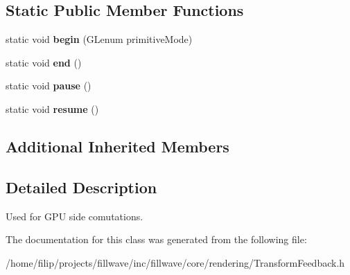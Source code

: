 \subsection*{Static Public Member Functions}
\begin{DoxyCompactItemize}
\item 
\mbox{\label{classflw_1_1flc_1_1TransformFeedback_a5ed5f1b7c44ae0021917762769c2c208}} 
static void {\bfseries begin} (G\+Lenum primitive\+Mode)
\item 
\mbox{\label{classflw_1_1flc_1_1TransformFeedback_aa1b77fac24fcb1c506e1e6d2bcd51de8}} 
static void {\bfseries end} ()
\item 
\mbox{\label{classflw_1_1flc_1_1TransformFeedback_a68b060b7cd41aeb3d05b16e529b0c2fe}} 
static void {\bfseries pause} ()
\item 
\mbox{\label{classflw_1_1flc_1_1TransformFeedback_a82ca365b8b8b1bed76029171f7718c88}} 
static void {\bfseries resume} ()
\end{DoxyCompactItemize}
\subsection*{Additional Inherited Members}


\subsection{Detailed Description}
Used for G\+PU side comutations. 

The documentation for this class was generated from the following file\+:\begin{DoxyCompactItemize}
\item 
/home/filip/projects/fillwave/inc/fillwave/core/rendering/Transform\+Feedback.\+h\end{DoxyCompactItemize}
